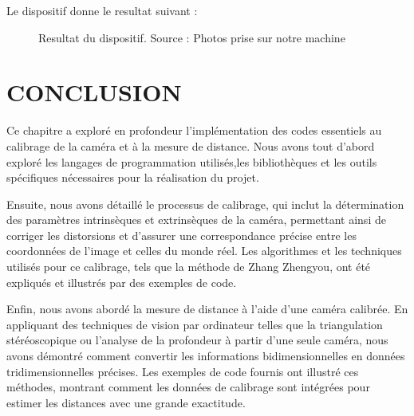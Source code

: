  
 Le dispositif donne le resultat suivant :
 
 \begin{figure}[H]%
 	\center%
 	\setlength{\fboxsep}{5pt}%
 	\setlength{\fboxrule}{0.5pt}%
 	\caption[Resultat du dispositif]{Resultat du dispositif. Source : Photos prise sur notre machine}
 	\label{fig:Resultat du dispositif}
 \end{figure}
 
 

\section{CONCLUSION}
 
 Ce chapitre a exploré en profondeur l'implémentation des codes essentiels au calibrage de la caméra et à la mesure de distance. Nous avons tout d'abord exploré les langages de programmation utilisés,les bibliothèques et les outils spécifiques nécessaires pour la réalisation du projet.
 
 Ensuite, nous avons détaillé le processus de calibrage, qui inclut la détermination des paramètres intrinsèques et extrinsèques de la caméra, permettant ainsi de corriger les distorsions et d'assurer une correspondance précise entre les coordonnées de l'image et celles du monde réel. Les algorithmes et les techniques utilisés pour ce calibrage, tels que la méthode de Zhang Zhengyou, ont été expliqués et illustrés par des exemples de code.
 
 Enfin, nous avons abordé la mesure de distance à l'aide d'une caméra calibrée. En appliquant des techniques de vision par ordinateur telles que la triangulation stéréoscopique ou l'analyse de la profondeur à partir d'une seule caméra, nous avons démontré comment convertir les informations bidimensionnelles en données tridimensionnelles précises. Les exemples de code fournis ont illustré ces méthodes, montrant comment les données de calibrage sont intégrées pour estimer les distances avec une grande exactitude.
 
  